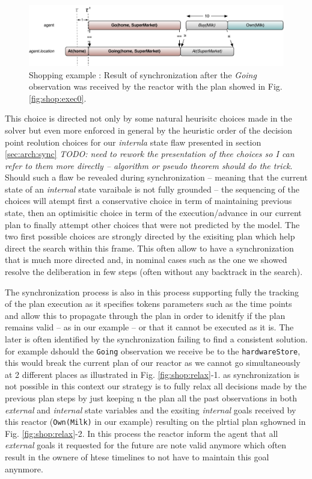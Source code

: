 \begin{figure}[!htb]
  \centering
  \includegraphics[width=0.7\columnwidth]{figs/shoping_exec_t1}
  \caption{Shopping example : Result of synchronization after the {\em
      Going} observation was received by the reactor with the plan
    showed in Fig. \ref{fig:shop:exec0}.}
  \label{fig:shop:exec1}
\end{figure}

This choice is directed not only by some natural heurisitc choices
made in the solver but even more enforced in general by the heuristic
order of the decision point reolution choices for our {\em internla}
state flaw presented in section \ref{sec:arch:sync} {\em\color{red}
  TODO: need to rework the presentation of thee choices so I can refer
  to them more directly -- algorithm or pseudo theorem should do the
  trick}. Should such a flaw be revealed during synchronization --
meaning that the current state of an {\em internal} state varaibale is
not fully grounded -- the sequencing of the choices will atempt first
a conservative choice in term of maintaining previous state, then an
optimisitic choice in term of the execution/advance in our current
plan to finally attempt other choices that were not predicted by the
model. The two first possible choices are strongly directed by the
exisiting plan which help direct the search within this frame. This
often allow to have a synchronization that is much more directed and, 
in nominal cases such as the one we showed resolve the deliberation 
in few steps (often without any backtrack in the search).

The synchronization process is also in this process supporting fully
the tracking of the plan execution as it specifies tokens parameters
such as the time points and allow this to propagate through the plan
in order to idenitfy if the plan remains valid -- as in our example --
or that it cannot be executed as it is. The later is often identified
by the synchronization failing to find a consistent solution. for
example dshould the \texttt{Going} observation we receive be to the
\texttt{hardwareStore}, this would break the current plan of our
reactor as we cannot go simultaneously at 2 different places as
illustrated in Fig. \ref{fig:shop:relax}-1. as synchronization is not
possible in this context our strategy is to fully relax all decisions
made by the previous plan steps by just keeping n the plan all the
past observations in both {\em external} and {\em internal} state
variables and the exsiting {\em internal} goals received by this
reactor (\texttt{Own(Milk)} in our example) resulting on the plrtial
plan sghowned in Fig. \ref{fig:shop:relax}-2. In this process the
reactor inform the agent that all {\em external} goals it requested
for the future are note valid anymore which often result in the ownere
of htese timelines to not have to maintain this goal anynmore.

